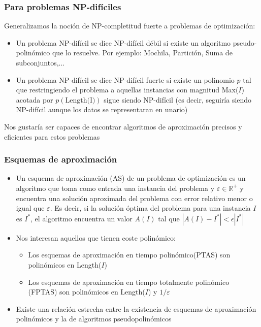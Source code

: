 \documentclass{beamer}
\begin{document}
\begin{frame}
	\frametitle{Para problemas NP-difíciles}
	Generalizamos la noción de NP-completitud fuerte a \alert{problemas de optimización}:
	\begin{itemize}
	\item Un problema NP-difícil se dice \alert{NP-difícil débil} si existe un algoritmo pseudo-polinómico que lo resuelve. Por ejemplo: Mochila, Partición, Suma de subconjuntos,...
	\item Un problema NP-difícil se dice \alert{NP-difícil fuerte} si existe un polinomio $p$ tal que restringiendo el problema a aquellas instancias con magnitud Max($I$) acotada por $p(\text{Length(I)})$ sigue siendo NP-difícil  (es decir, seguiría siendo NP-difícil aunque los datos se representaran en unario)
    \end{itemize}
    Nos gustaría ser capaces de encontrar algoritmos de aproximación precisos y eficientes para estos problemas
\end{frame}

\begin{frame}
	\frametitle{Esquemas de aproximación}
	\begin{itemize}
		\item Un \alert{esquema de aproximación} (AS) de un problema de optimización es un algoritmo que toma como entrada una instancia del problema y $\varepsilon\in\mathbb{R}^+$  y encuentra una solución aproximada del problema con error relativo menor o igual que $\varepsilon$. Es decir, si la solución óptima del problema para una instancia $I$ es $I^*$, el algoritmo encuentra un valor $A(I)$ tal que $|A(I)-I^*|<\epsilon|I^*|$
		\item Nos interesan aquellos que tienen coste polinómico:
		\begin{itemize}
			\item Los esquemas de aproximación en tiempo polinómico(PTAS) son polinómicos en Length($I$)
			\item Los esquemas de aproximación en tiempo totalmente polinómico (FPTAS) son polinómicos en Length($I$) y $1/\varepsilon$
		\end{itemize}
		\item Existe una relación estrecha entre la existencia de esquemas de aproximación polinómicos y la de algoritmos pseudopolinómicos
	\end{itemize}
\end{frame}
\end{document}
